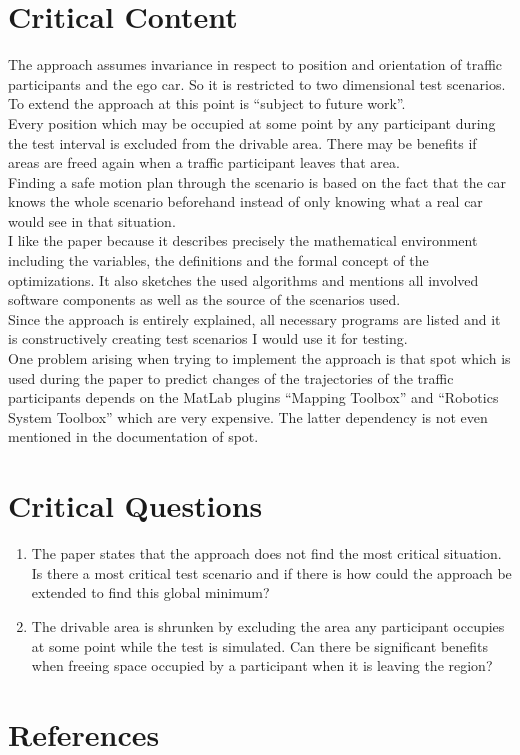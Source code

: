 \documentclass[oneside, notitlepage, twocolumn]{scrartcl}
\begin{document}
\section{Critical Content}
The approach assumes invariance in respect to position and orientation of traffic participants and the ego car.
So it is restricted to two dimensional test scenarios.
To extend the approach at this point is ``subject to future work''.\\
Every position which may be occupied at some point by any participant during the test interval is excluded from the drivable area.
There may be benefits if areas are freed again when a traffic participant leaves that area.\\
Finding a safe motion plan through the scenario is based on the fact that the car knows the whole scenario beforehand instead of only knowing what a real car would see in that situation.\\
I like the paper because it describes precisely the mathematical environment including the variables, the definitions and the formal concept of the optimizations.
It also sketches the used algorithms and mentions all involved software components as well as the source of the scenarios used.\\
Since the approach is entirely explained, all necessary programs are listed and it is constructively creating test scenarios I would use it for testing.\\
One problem arising when trying to implement the approach is that \gls{spot} which is used during the paper to predict changes of the trajectories of the traffic participants depends on the MatLab plugins ``Mapping Toolbox'' and ``Robotics System Toolbox'' which are very expensive.
The latter dependency is not even mentioned in the documentation of \gls{spot}.

\section{Critical Questions}
\begin{enumerate}
    \item The paper states that the approach does not find the most critical situation.
        Is there a most critical test scenario and if there is how could the approach be extended to find this global minimum?
    \item The drivable area is shrunken by excluding the area any participant occupies at some point while the test is simulated.
        Can there be significant benefits when freeing space occupied by a participant when it is leaving the region?
\end{enumerate}

\section{References}
\begingroup
\renewcommand{\section}[2]{}%
\nocite{*}
\printbibliography%
\endgroup
\end{document}
